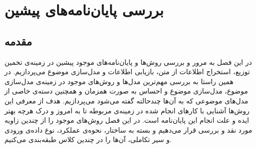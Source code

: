 \chapter{بررسی پایان‌‌نامه‌های پیشین}
\thispagestyle{empty}
\section{مقدمه}
در این فصل به مرور و بررسی روش‌ها و پایان‌‌نامه‌های موجود پیشین در زمینه‌ی  تخمین توزیع، 
استخراج اطلاعات
از متن، بازیابی اطلاعات و مدل‌سازی  موضوع می‌پردازیم. در همین راستا  به بررسی‌ مهم‌ترین مدل‌ها و روش‌های موجود در زمینه‌ی مدل‌سازی موضوع، مدل‌سازی موضوع و احساس به صورت همزمان و همچنین دسته‌ی خاصی‌ از مدل‌های موضوعی که به آن‌ها چندحالته گفته می‌‌شود می‌‌پردازیم. هدف از معرفی‌ این روش‌ها آشنایی با کار‌های انجام شده در زمینه‌ی مربوطه تا به امروز و درک هرچه بهتر ایده و علت انجام این پایان‌‌نامه است. در این فصل روش‌های موجود را از چندین زاویه مورد نقد و بررسی‌ قرار می‌‌دهیم و بسته به ساختار، نحوه‌ی عملکرد، نوع داده‌ی ورودی و سیر تکاملی، آن‌ها را در چندین کلاس طبقه‌بندی می‌‌کنیم.

